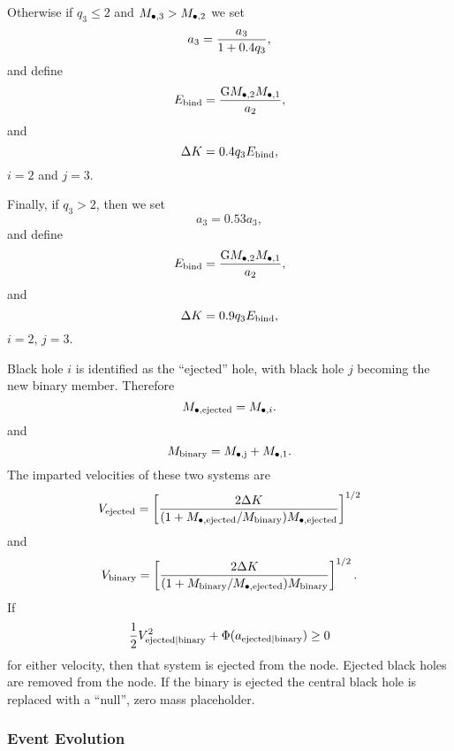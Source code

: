 Otherwise if $q_3 \le 2$ and $M_{\bullet, 3} > M_{\rm \bullet, 2}$ we set
\begin{equation}
a_3 = { a_3 \over 1 +0.4 q_3},
\end{equation}
and define
\begin{equation}
E_{\rm bind} = {{\rm G} M_{\bullet, 2} M_{\bullet, 1} \over a_2},
\end{equation}
and
\begin{equation}
 \Delta K =0.4 q_3 E_{\rm bind},
\end{equation}
$i=2$ and $j=3$.

Finally, if $q_3 > 2$, then we set
\begin{equation}
a_3 =0.53 a_3,
\end{equation}
and define
\begin{equation}
E_{\rm bind} = {{\rm G} M_{\bullet, 2} M_{\bullet, 1} \over a_2},
\end{equation}
and
\begin{equation}
\Delta K =0.9 q_3 E_{\rm bind},
\end{equation}
$i=2$, $j=3$.

Black hole $i$ is identified as the ``ejected'' hole, with black hole $j$ becoming the new binary member. Therefore
\begin{equation}
 M_{\bullet, \rm ejected} = M_{\bullet, i}.
\end{equation}
and
\begin{equation}
 M_{\rm binary} = M_{\rm \bullet, j} + M_{\rm \bullet, 1}.
\end{equation}
The imparted velocities of these two systems are
\begin{equation}
 V_{\rm ejected} = \left[ {2 \Delta K \over (1+M_{\bullet, \rm ejected}/M_{\rm binary} ) M_{\bullet, \rm ejected} }\right]^{1/2}
\end{equation}
and
\begin{equation}
 V_{\rm binary} = \left[ {2 \Delta K \over (1+M_{\rm binary} /M_{\bullet, \rm ejected}) M_{\rm binary}}\right]^{1/2}.
\end{equation}
If
\begin{equation}
 \frac{1}{2} V_{\rm ejected|binary}^2 + \Phi(a_{\rm ejected|binary}) \ge 0
\end{equation}
for either velocity, then that system is ejected from the node. Ejected black holes are removed from the node. If the binary is ejected the central black hole is replaced with a ``null'', zero mass placeholder.

\subsubsection{Event Evolution}

